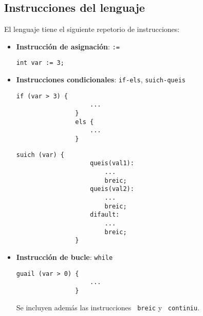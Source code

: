 \documentclass[10pt,a4paper]{article}
\begin{document}
\subsection{Instrucciones del lenguaje}
El lenguaje tiene el siguiente repetorio de instrucciones:
\begin{itemize}
    \item \textbf{Instrucción de asignación}: \texttt{:=}
    \begin{center}
        \begin{minipage}{\linewidth}
            \begin{lstlisting}[linewidth=0.3\linewidth, gobble=16]
                int var := 3;
            \end{lstlisting}
        \end{minipage}
    \end{center}
    
    \item \textbf{Instrucciones condicionales}: \texttt{if-els}, \texttt{suich-queis}
    \begin{center}
        \begin{minipage}{\linewidth}
            \begin{lstlisting}[linewidth=0.3\linewidth, gobble=16]
                if (var > 3) {
                    ...
                }
                els {
                    ...
                }
            \end{lstlisting}
        \end{minipage}
    \end{center}
    \begin{center}
        \begin{minipage}{\linewidth}
            \begin{lstlisting}[linewidth=0.3\linewidth, gobble=16]
                suich (var) {
                    queis(val1):
                        ...
                        breic;
                    queis(val2):
                        ...
                        breic;
                    difault:
                        ...
                        breic;
                }
            \end{lstlisting}
        \end{minipage}
    \end{center}

    \item \textbf{Instrucción de bucle}: \texttt{while}
    \begin{center}
        \begin{minipage}{\linewidth}
            \begin{lstlisting}[linewidth=0.3\linewidth, gobble=16]
                guail (var > 0) {
                    ...
                }
            \end{lstlisting}
        \end{minipage}
    \end{center}
    Se incluyen además las instrucciones \texttt{\color{blue} breic} y \texttt{\color{blue} continiu}.


\end{itemize}
\end{document}
